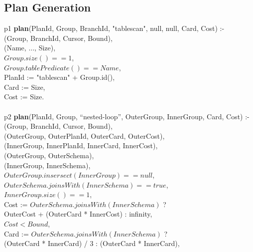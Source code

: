 \subsection{Plan Generation}

\begin{figure*}
\ssp
\centering
\begin{boxedminipage}{\linewidth}
p1 {\bf plan}(PlanId, Group, BranchId, "tablescan", null, null, Card, Cost) :- \\
(Group, BranchId, Cursor, Bound), \\
(Name, $\ldots$, Size), \\
\datalogspace $Group.size() == 1$, \\
\datalogspace $Group.tablePredicate() == Name$, \\
\datalogspace PlanId := "tablescan" + Group.id(), \\
\datalogspace Card := Size, \\
\datalogspace Cost := Size. \\
\\
p2 {\bf plan}(PlanId, Group, ``nested-loop'', OuterGroup, InnerGroup, Card, Cost) :- \\
(Group, BranchId, Cursor, Bound), \\
(OuterGroup, OuterPlanId, OuterCard, OuterCost), \\
(InnerGroup, InnerPlanId, InnerCard, InnerCost), \\
(OuterGroup, OuterSchema), \\
(InnerGroup, InnerSchema), \\
\datalogspace $OuterGroup.insersect(InnerGroup) ==  null$, \\
\datalogspace $OuterSchema.joinsWith(InnerSchema) ==  true$, \\
\datalogspace $InnerGroup.size() == 1$, \\
\datalogspace Cost := $OuterSchema.joinsWith(InnerSchema)$ ? \\
\datalogspace \datalogspace OuterCost + (OuterCard * InnerCost) : infinity, \\
\datalogspace $Cost < Bound$, \\
\datalogspace Card := $OuterSchema.joinsWith(InnerSchema)$ ? \\
\datalogspace \datalogspace (OuterCard * InnerCard) / 3 : (OuterCard * InnerCard), \\

\end{boxedminipage}
\end{figure*}

